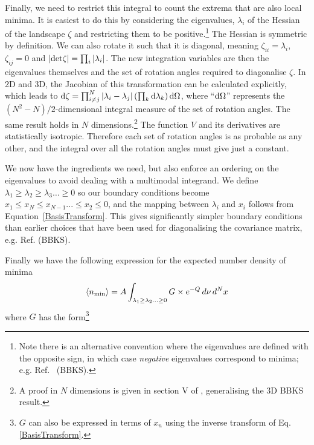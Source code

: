 \documentclass[12pt]{article}
\begin{document}
Finally, we need to restrict this integral to count the extrema that are also local minima. It is easiest to do this by considering the eigenvalues, $\lambda_i$ of the Hessian of the landscape $\zeta$ and restricting them to be positive.\footnote{Note there is an alternative convention where the eigenvalues are defined with the opposite sign, in which case \emph{negative} eigenvalues correspond to minima; e.g. Ref.~\cite{BBKS} (BBKS).}  The Hessian is symmetric by definition. We can also rotate it such that it is diagonal, meaning  $\zeta_{ii}=\lambda_i$, $\zeta_{ij}=0$ and $|{\rm det} \zeta| = \prod_i |\lambda_i|$. The new integration variables are then the eigenvalues themselves and the set of rotation angles required to diagonalise $\zeta$.  In 2D and 3D, the Jacobian of this transformation can be calculated explicitly, which leads to  ${\rm d} \zeta = \prod_{i \neq j}^N |\lambda_i - \lambda_j|\left(\prod_k {\rm d}\lambda_k\right) {\rm d} \Omega$, where ``${\rm d}\Omega$'' represents the $(N^2-N)/2$-dimensional integral measure of the set of rotation angles. The same result holds in $N$ dimensions.\footnote{A proof in $N$ dimensions is given in section V of \cite{Easther2016}, generalising the 3D  BBKS result.} The function $V$ and its derivatives are statistically isotropic. Therefore each set of rotation angles is as probable as any other, and the integral over all the rotation angles must give just a constant.

We now have  the ingredients we  need, but  also enforce an ordering on the eigenvalues to avoid dealing with a multimodal integrand.  We define  $\lambda_1 \geq \lambda_2 \geq \lambda_3 \ldots \geq 0$ so our boundary conditions become $x_1\leq x_N\leq x_{N-1} ... \leq x_2 \leq 0$, and the mapping between $\lambda_i$ and $x_i$  follows from Equation~\ref{BasisTransform}. This gives significantly simpler boundary conditions than earlier choices that have been used for diagonalising the covariance matrix, e.g. Ref.\cite{BBKS} (BBKS).

Finally we have the following expression for the expected number density of minima 
%
\begin{equation} \label{DensityOfPeaks}
\langle n_{{\rm min}} \rangle = A \int_{\lambda_1 \geq \lambda_2 \ldots \geq 0} G \times e^{-Q} \, d\nu \,d^Nx
\end{equation}
%
\noindent where $G$ has the form\footnote{$G$ can also be expressed in terms of $x_n$ using the inverse transform of Eq. \ref{BasisTransform}.}
\end{document}
